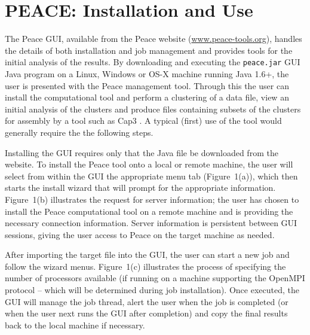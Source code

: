 \documentclass[a4,center,fleqn]{NAR}
\begin{document}
\enlargethispage{-65.1pt}

\section{PEACE: Installation and Use}

The {\sc Peace} GUI, available from the {\sc Peace} website
(\href{http://www.peace-tools.org}{www.peace-tools.org}), handles the
details of both installation and job management and provides tools for
the initial analysis of the results.  By downloading and executing the
{\tt peace.jar} GUI Java program on a Linux, Windows or OS-X machine
running Java 1.6+, the user is presented with the {\sc Peace}
management tool.  Through this the user can install the computational
tool and perform a clustering of a data file, view an initial analysis
of the clusters and produce files containing subsets of the clusters
for assembly by a tool such as {\sc Cap3} \cite{Huang99}.  A typical
(first) use of the tool would generally require the the following
steps.

 Installing the GUI requires only
that the Java file be downloaded from the website.  To install the
{\sc Peace} tool onto a local or remote machine, the user will select
from within the GUI the appropriate menu tab (Figure~1(a)), which
then starts the install wizard that will prompt for the appropriate
information.  Figure~1(b) illustrates the request for server
information; the user has chosen to install the {\sc Peace}
computational tool on a remote machine and is providing the necessary
connection information.  Server information is persistent between GUI
sessions, giving the user access to {\sc Peace} on the target machine
as needed.

 After importing the target file into
the GUI, the user can start a new job and follow the wizard menus.
Figure~1(c) illustrates the process of specifying the number of
processors available (if running on a machine supporting the OpenMPI
protocol -- which will be determined during job installation).  Once
executed, the GUI will manage the job thread, alert the user when the
job is completed (or when the user next runs the GUI after completion)
and copy the final results back to the local machine if necessary.
\end{document}
